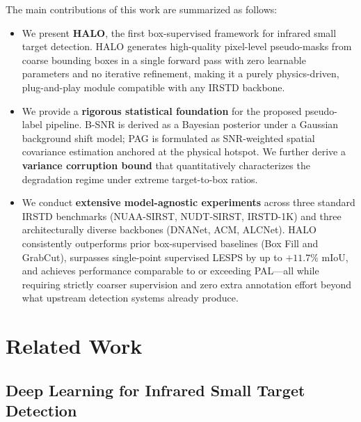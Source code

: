 The main contributions of this work are summarized as follows:

\begin{itemize}
    \item We present \textbf{HALO}, the first box-supervised framework for infrared
    small target detection.
    HALO generates high-quality pixel-level pseudo-masks from coarse bounding boxes
    in a single forward pass with zero learnable parameters and no iterative refinement,
    making it a purely physics-driven, plug-and-play module compatible with any IRSTD
    backbone.

    \item We provide a \textbf{rigorous statistical foundation} for the proposed
    pseudo-label pipeline.
    B-SNR is derived as a Bayesian posterior under a Gaussian background shift model;
    PAG is formulated as SNR-weighted spatial covariance estimation anchored at the
    physical hotspot.
    We further derive a \textbf{variance corruption bound} that quantitatively
    characterizes the degradation regime under extreme target-to-box ratios.

    \item We conduct \textbf{extensive model-agnostic experiments} across three standard
    IRSTD benchmarks (NUAA-SIRST, NUDT-SIRST, IRSTD-1K) and three architecturally
    diverse backbones (DNANet, ACM, ALCNet).
    HALO consistently outperforms prior box-supervised baselines (Box Fill and GrabCut),
    surpasses single-point supervised LESPS by up to $+11.7\%$ mIoU, and achieves
    performance comparable to or exceeding PAL---all while requiring strictly coarser
    supervision and zero extra annotation effort beyond what upstream detection
    systems already produce.
\end{itemize}


\section{Related Work}\label{sec:related}

\subsection{Deep Learning for Infrared Small Target Detection}
\label{sec:related_dl}

